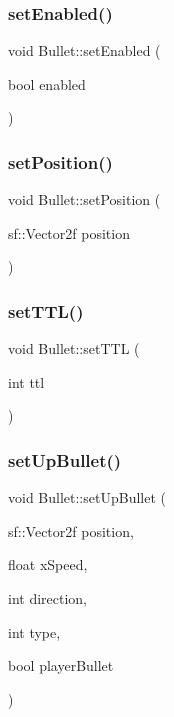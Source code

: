 \mbox{\label{class_bullet_a31f36da7eb69fdf357670f2ac7bbae85}} 
\subsubsection{\texorpdfstring{set\+Enabled()}{setEnabled()}}
{\footnotesize\ttfamily void Bullet\+::set\+Enabled (\begin{DoxyParamCaption}\item[{bool}]{enabled }\end{DoxyParamCaption})}

\mbox{\label{class_bullet_a143a06245534960d6af5ffb10b101750}} 
\subsubsection{\texorpdfstring{set\+Position()}{setPosition()}}
{\footnotesize\ttfamily void Bullet\+::set\+Position (\begin{DoxyParamCaption}\item[{sf\+::\+Vector2f}]{position }\end{DoxyParamCaption})}

\mbox{\label{class_bullet_abbf2bd440aade1c9f0f8f61d333ca64a}} 
\subsubsection{\texorpdfstring{set\+T\+T\+L()}{setTTL()}}
{\footnotesize\ttfamily void Bullet\+::set\+T\+TL (\begin{DoxyParamCaption}\item[{int}]{ttl }\end{DoxyParamCaption})}

\mbox{\label{class_bullet_a2ac1e1ac43af3bbd0d7c2a72e0e17e51}} 
\subsubsection{\texorpdfstring{set\+Up\+Bullet()}{setUpBullet()}}
{\footnotesize\ttfamily void Bullet\+::set\+Up\+Bullet (\begin{DoxyParamCaption}\item[{sf\+::\+Vector2f}]{position,  }\item[{float}]{x\+Speed,  }\item[{int}]{direction,  }\item[{int}]{type,  }\item[{bool}]{player\+Bullet }\end{DoxyParamCaption})}

